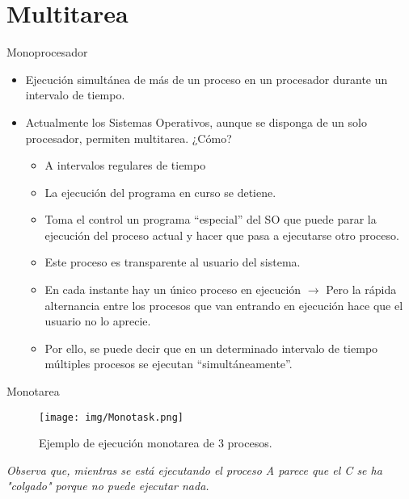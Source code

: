 \documentclass{beamer}
\begin{document}
\section{Multitarea}

\begin{frame}{Monoprocesador}
    \begin{itemize}
        \item Ejecución simultánea de más de un proceso en un procesador durante un intervalo de tiempo.
        \item Actualmente los Sistemas Operativos, aunque se disponga de un solo procesador, permiten multitarea. ¿Cómo?
    \begin{itemize}
        \item   A intervalos regulares de tiempo
    \item   La ejecución del programa en curso se detiene.
    \item   Toma el control un programa “especial” del SO que puede parar la ejecución del proceso actual y hacer que pasa a ejecutarse otro proceso.
    \item   Este proceso es transparente al usuario del sistema.
    \item   En cada instante hay un único proceso en ejecución $\to$ Pero la rápida alternancia entre los procesos que van entrando en ejecución hace que el usuario no lo aprecie.
    \item   Por ello, se puede decir que en un determinado intervalo de tiempo múltiples procesos se ejecutan “simultáneamente”.
    \end{itemize}

\end{itemize}
\end{frame}

\begin{frame}{Monotarea}
  \begin{figure}
        \centering
        \texttt{[image: img/Monotask.png]} 
        \caption{Ejemplo de ejecución monotarea de 3 procesos.}
    \end{figure}

    \textit{Observa que, mientras se está ejecutando el proceso A parece que el C se ha "colgado" porque no puede ejecutar nada.}
\end{frame}
\end{document}
